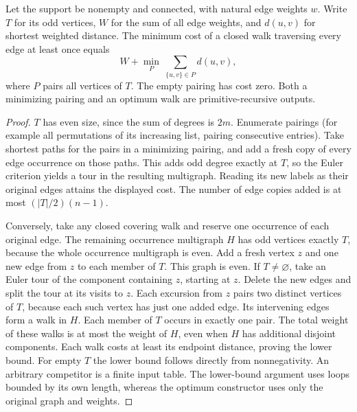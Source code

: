 \begin{theorem}\leavevmode\label{stpostman}
Let the support be nonempty and connected, with natural edge weights $w$. Write $T$ for its odd vertices, $W$ for the sum of all edge weights, and $d(u,v)$ for shortest weighted distance. The minimum cost of a closed walk traversing every edge at least once equals
\[
 W+\min_P\ \sum_{\{u,v\}\in P}d(u,v),
\]
where $P$ pairs all vertices of $T$. The empty pairing has cost zero. Both a minimizing pairing and an optimum walk are primitive-recursive outputs.
\end{theorem}
\begin{proof}
$T$ has even size, since the sum of degrees is $2m$. Enumerate pairings (for example all permutations of its increasing list, pairing consecutive entries). Take shortest paths for the pairs in a minimizing pairing, and add a fresh copy of every edge occurrence on those paths. This adds odd degree exactly at $T$, so the Euler criterion yields a tour in the resulting multigraph. Reading its new labels as their original edges attains the displayed cost. The number of edge copies added is at most $(|T|/2)(n-1)$.

Conversely, take any closed covering walk and reserve one occurrence of each original edge. The remaining occurrence multigraph $H$ has odd vertices exactly $T$, because the whole occurrence multigraph is even. Add a fresh vertex $z$ and one new edge from $z$ to each member of $T$. This graph is even. If $T\ne\varnothing$, take an Euler tour of the component containing $z$, starting at $z$. Delete the new edges and split the tour at its visits to $z$. Each excursion from $z$ pairs two distinct vertices of $T$, because each such vertex has just one added edge. Its intervening edges form a walk in $H$. Each member of $T$ occurs in exactly one pair. The total weight of these walks is at most the weight of $H$, even when $H$ has additional disjoint components. Each walk costs at least its endpoint distance, proving the lower bound. For empty $T$ the lower bound follows directly from nonnegativity. An arbitrary competitor is a finite input table. The lower-bound argument uses loops bounded by its own length, whereas the optimum constructor uses only the original graph and weights.
\end{proof}

